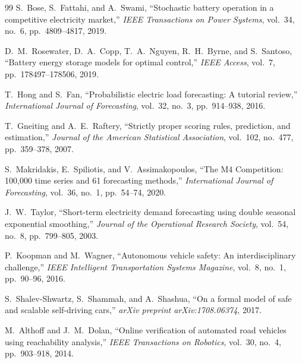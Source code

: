 \begin{thebibliography}{99}
S.~Bose, S.~Fattahi, and A.~Swami,
``Stochastic battery operation in a competitive electricity market,''
\emph{IEEE Transactions on Power Systems}, vol.~34, no.~6, pp.~4809--4817, 2019.

D.~M.~Rosewater, D.~A.~Copp, T.~A.~Nguyen, R.~H.~Byrne, and S.~Santoso,
``Battery energy storage models for optimal control,''
\emph{IEEE Access}, vol.~7, pp.~178497--178506, 2019.


T.~Hong and S.~Fan,
``Probabilistic electric load forecasting: A tutorial review,''
\emph{International Journal of Forecasting}, vol.~32, no.~3, pp.~914--938, 2016.

T.~Gneiting and A.~E.~Raftery,
``Strictly proper scoring rules, prediction, and estimation,''
\emph{Journal of the American Statistical Association}, vol.~102, no.~477,
pp.~359--378, 2007.

S.~Makridakis, E.~Spiliotis, and V.~Assimakopoulos,
``The M4 Competition: 100,000 time series and 61 forecasting methods,''
\emph{International Journal of Forecasting}, vol.~36, no.~1, pp.~54--74, 2020.

J.~W.~Taylor,
``Short-term electricity demand forecasting using double seasonal exponential smoothing,''
\emph{Journal of the Operational Research Society}, vol.~54, no.~8, pp.~799--805, 2003.


P.~Koopman and M.~Wagner,
``Autonomous vehicle safety: An interdisciplinary challenge,''
\emph{IEEE Intelligent Transportation Systems Magazine}, vol.~8, no.~1, pp.~90--96, 2016.

S.~Shalev-Shwartz, S.~Shammah, and A.~Shashua,
``On a formal model of safe and scalable self-driving cars,''
\emph{arXiv preprint arXiv:1708.06374}, 2017.

M.~Althoff and J.~M.~Dolan,
``Online verification of automated road vehicles using reachability analysis,''
\emph{IEEE Transactions on Robotics}, vol.~30, no.~4, pp.~903--918, 2014.


\end{thebibliography}
